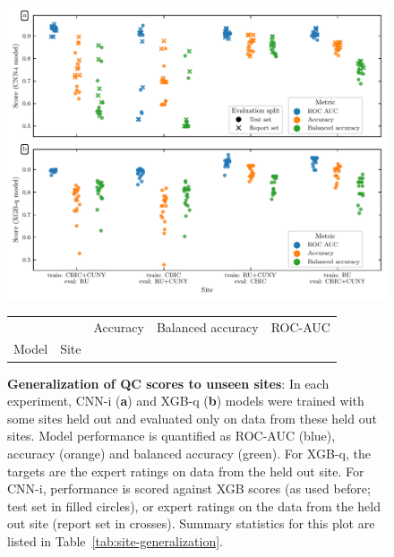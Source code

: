 \documentclass[fleqn,10pt,inline]{wlscirep}
\begin{document}
\begin{figure}[tbp]
    {\label{fig:site-generalization:dl}}
    {\label{fig:site-generalization:xgb}}
    \centering
    \includegraphics[width=\linewidth]{site_generalization.pdf}
    \caption{%
        {\bf Generalization of QC scores to unseen sites}: In each experiment, CNN-i (\textbf{a}) and XGB-q (\textbf{b}) models were trained with some sites held out and evaluated only on data from these held out sites. Model performance is quantified as ROC-AUC (blue), accuracy (orange) and balanced accuracy (green). For XGB-q, the targets are the expert ratings on data from the held out site. For CNN-i, performance is scored against XGB scores (as used before; test set in filled circles), or expert ratings on the data from the held out site (report set in crosses). Summary statistics for this plot are listed in Table~\ref{tab:site-generalization}.
    }
    \label{fig:site-generalization}
    \vspace{1em}
    \begin{tabular}{lllll}
    \toprule
          &                            &       Accuracy & Balanced accuracy &        ROC-AUC \\
    Model & Site &                &                   &                \\

\end{tabular}
\end{figure}
\end{document}
